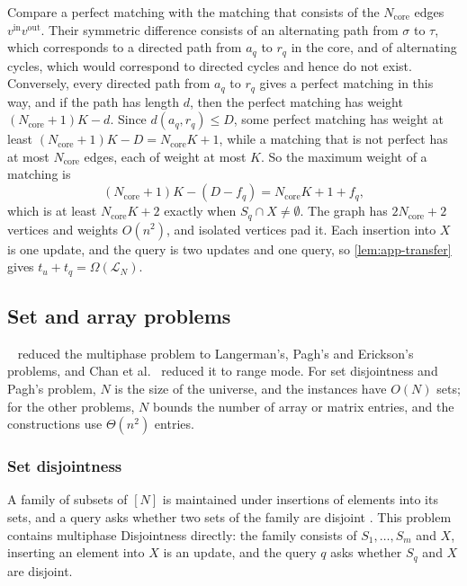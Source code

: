 Compare a perfect matching with the matching that consists of the $N_{\mathrm{core}}$ edges $v^{\mathrm{in}}v^{\mathrm{out}}$. Their symmetric difference consists of an alternating path from $\sigma$ to $\tau$, which corresponds to a directed path from $a_q$ to $r_q$ in the core, and of alternating cycles, which would correspond to directed cycles and hence do not exist. Conversely, every directed path from $a_q$ to $r_q$ gives a perfect matching in this way, and if the path has length $d$, then the perfect matching has weight $(N_{\mathrm{core}}+1)K-d$. Since $d(a_q,r_q)\le D$, some perfect matching has weight at least $(N_{\mathrm{core}}+1)K-D=N_{\mathrm{core}}K+1$, while a matching that is not perfect has at most $N_{\mathrm{core}}$ edges, each of weight at most $K$. So the maximum weight of a matching is
\[
 (N_{\mathrm{core}}+1)K-(D-f_q)=N_{\mathrm{core}}K+1+f_q,
\]
which is at least $N_{\mathrm{core}}K+2$ exactly when $S_q\cap X\ne\emptyset$. The graph has $2N_{\mathrm{core}}+2$ vertices and weights $O(n^2)$, and isolated vertices pad it. Each insertion into $X$ is one update, and the query is two updates and one query, so \cref{lem:app-transfer} gives $t_u+t_q=\Omega(\mathcal L_N)$.

\subsection{Set and array problems}\label{sec:other-problems}

\Patrascu~\cite{patrascu_mihai_towards_2010} reduced the multiphase problem to Langerman's, Pagh's and Erickson's problems, and Chan et al.~\cite{chan_linear-space_2014} reduced it to range mode. For set disjointness and Pagh's problem, $N$ is the size of the universe, and the instances have $O(N)$ sets; for the other problems, $N$ bounds the number of array or matrix entries, and the constructions use $\Theta(n^2)$ entries.

\subsubsection{Set disjointness}\label{sec:set-disjointness}

A family of subsets of $[N]$ is maintained under insertions of elements into its sets, and a query asks whether two sets of the family are disjoint \cite{kopelowitz_dynamic_2015}. This problem contains multiphase Disjointness directly: the family consists of $S_1,\dots,S_m$ and $X$, inserting an element into $X$ is an update, and the query $q$ asks whether $S_q$ and $X$ are disjoint.

